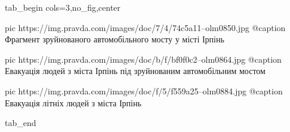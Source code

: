  
 
 
 
 


\ifcmt
  tab_begin cols=3,no_fig,center

     pic https://img.pravda.com/images/doc/7/4/74c5a11--olm0850.jpg
		 @caption Фрагмент зруйнованого автомобільного мосту у місті Ірпінь

		 pic https://img.pravda.com/images/doc/b/f/bf0f0c2--olm0864.jpg
		 @caption Евакуація людей з міста Ірпінь під зруйнованим автомобільним мостом

		 pic https://img.pravda.com/images/doc/f/5/f559a25--olm0884.jpg
		 @caption Евакуація літніх людей з міста Ірпінь

  tab_end
\fi
